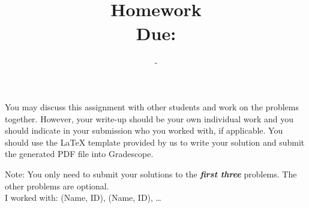 \documentclass{article}
\title{
    \vspace{-0.4in}
    \textmd{\textbf{\hmwkClass \\ Homework \hmwkNo}}\\
    \normalsize\vspace{0.1in}\small{Due: \hmwkDueDate}\\
}
\author{\hmwkAuthorName\ -\ \hmwkAuthorID}
\date{}
\begin{document}
\maketitle
\thispagestyle{fancy}

You may discuss this assignment with other students and work
on the problems together. However, your write-up should be your own individual work and you should indicate in your submission who you worked with, if applicable. You should use the {\LaTeX} template provided by us to write your solution and submit the generated PDF file into Gradescope.

Note: You only need to submit your solutions to the \textbf{\emph{first three}} problems. The other problems are optional. \\

I worked with: (Name, ID), (Name, ID), \ldots
\end{document}
